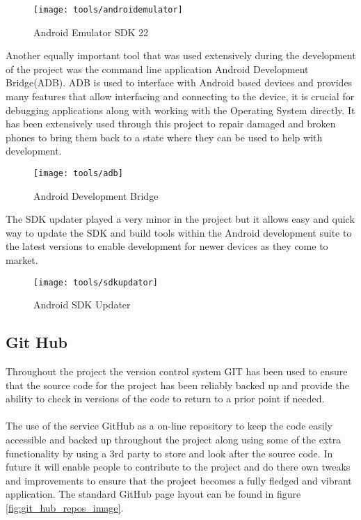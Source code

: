 \begin{figure}[H]
    \centering
    \texttt{[image: tools/androidemulator]}
    \caption{Android Emulator SDK 22}
    \label{fig:android_emulator}
\end{figure} 

\label{sec:adb}
\noindent
Another equally important tool that was used extensively during the development of the project was the command line application Android Development Bridge(ADB). ADB is used to interface with Android based devices and provides many features that allow interfacing and connecting to the device, it is crucial for debugging applications along with working with the Operating System directly. It has been extensively used through this project to repair damaged and broken phones to bring them back to a state where they can be used to help with development.

\begin{figure}[H]
    \centering
    \texttt{[image: tools/adb]}
    \caption{Android Development Bridge}
    \label{fig:adb_image}
\end{figure} 

\noindent
The SDK updater played a very minor in the project but it allows easy and quick way to update the SDK and build tools within the Android development suite to the latest versions to enable development for newer devices as they come to market.

\begin{figure}[H]
    \centering
    \texttt{[image: tools/sdkupdator]}
    \caption{Android SDK Updater}
    \label{fig:sdk_updator}
\end{figure} 

\subsection*{Git Hub}

Throughout the project the version control system GIT has been used to ensure that the source code for the project has been reliably backed up and provide the ability to check in versions of the code to return to a prior point if needed.\\
\\
The use of the service GitHub as a on-line repository to keep the code easily accessible and backed up throughout the project along using some of the extra functionality by using a 3rd party to store and look after the source code. In future it will enable people to contribute to the project and do there own tweaks and improvements to ensure that the project becomes a fully fledged and vibrant application. The standard GitHub page layout can be found in figure \ref{fig:git_hub_repos_image}.

